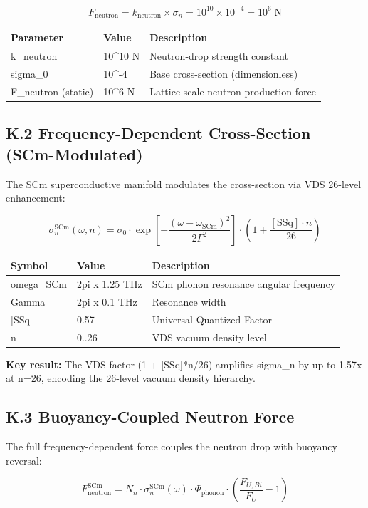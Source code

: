 \documentclass[11pt]{article}
\begin{document}
$$F_{\mathrm{neutron}} = k_{\mathrm{neutron}} \times \sigma_n = 10^{10} \times 10^{-4} = 10^6 \;\text{N}$$

\begin{center}
\begin{longtable}{lll}
\toprule
Parameter & Value & Description \tabularnewline
\midrule
\endhead
k\_neutron & 10\textasciicircum{}10 N & Neutron-drop strength constant \tabularnewline
sigma\_0 & 10\textasciicircum{}-4 & Base cross-section (dimensionless) \tabularnewline
F\_neutron (static) & 10\textasciicircum{}6 N & Lattice-scale neutron production force \tabularnewline
\bottomrule
\end{longtable}
\end{center}

\subsection*{K.2 Frequency-Dependent Cross-Section (SCm-Modulated)}

The SCm superconductive manifold modulates the cross-section via VDS 26-level enhancement:

$$\sigma_n^{\mathrm{SCm}}(\omega, n) = \sigma_0 \cdot \exp\!\left[-\frac{(\omega - \omega_{\mathrm{SCm}})^2}{2\Gamma^2}\right] \cdot \left(1 + \frac{[\text{SSq}] \cdot n}{26}\right)$$

\begin{center}
\begin{longtable}{lll}
\toprule
Symbol & Value & Description \tabularnewline
\midrule
\endhead
omega\_SCm & 2pi x 1.25 THz & SCm phonon resonance angular frequency \tabularnewline
Gamma & 2pi x 0.1 THz & Resonance width \tabularnewline
{}[SSq] & 0.57 & Universal Quantized Factor \tabularnewline
n & 0..26 & VDS vacuum density level \tabularnewline
\bottomrule
\end{longtable}
\end{center}

\textbf{Key result:} The VDS factor (1 + [SSq]*n/26) amplifies sigma\_n by up to 1.57x at n=26, encoding the 26-level vacuum density hierarchy.

\subsection*{K.3 Buoyancy-Coupled Neutron Force}

The full frequency-dependent force couples the neutron drop with buoyancy reversal:

$$F_{\mathrm{neutron}}^{\mathrm{SCm}} = N_n \cdot \sigma_n^{\mathrm{SCm}}(\omega) \cdot \Phi_{\mathrm{phonon}} \cdot \left(\frac{F_{U,Bi}}{F_U} - 1\right)$$
\end{document}
